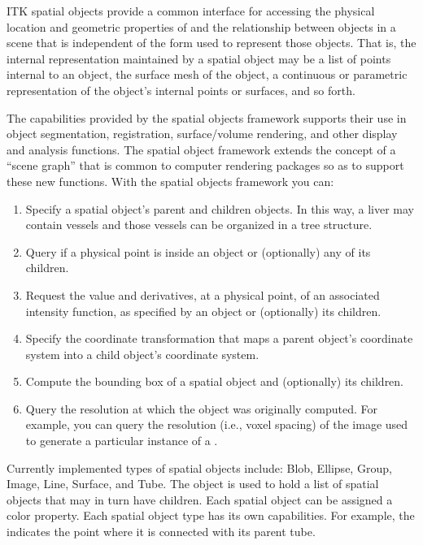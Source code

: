 ITK spatial objects provide a common interface for accessing the physical
location and geometric properties of and the relationship between objects in
a scene that is independent of the form used to represent those objects. That
is, the internal representation maintained by a spatial object may be a list
of points internal to an object, the surface mesh of the object, a continuous
or parametric representation of the object's internal points or surfaces, and
so forth.

The capabilities provided by the spatial objects framework supports their use
in object segmentation, registration, surface/volume rendering, and other
display and analysis functions. The spatial object framework extends the
concept of a ``scene graph''  that is common to computer
rendering packages so as to support these new functions. With the spatial
objects framework you can:
\begin{enumerate}

        \item Specify a spatial object's parent and children objects. In
        this way, a liver may contain vessels and those vessels can be
        organized in a tree structure.

        \item Query if a physical point is inside an object or
        (optionally) any of its children.

        \item Request the value and derivatives, at a physical point,
        of an associated intensity function, as specified
        by an object or (optionally) its children.

        \item Specify the coordinate transformation that maps a parent
        object's coordinate system into a child object's coordinate system.

        \item Compute the bounding box of a spatial object and (optionally)
        its children.

        \item Query the resolution at which the object was originally
        computed.  For example, you can query the resolution (i.e., voxel
        spacing) of the image used to generate a particular instance of a
        .
\end{enumerate}

Currently implemented types of spatial objects include: Blob, Ellipse, Group,
Image, Line, Surface, and Tube. The  object is used to hold
a list of spatial objects that may in turn have children. Each spatial
object can be assigned a color property. Each spatial object type has its
own capabilities. For example, the  indicates the
point where it is connected with its parent tube.

